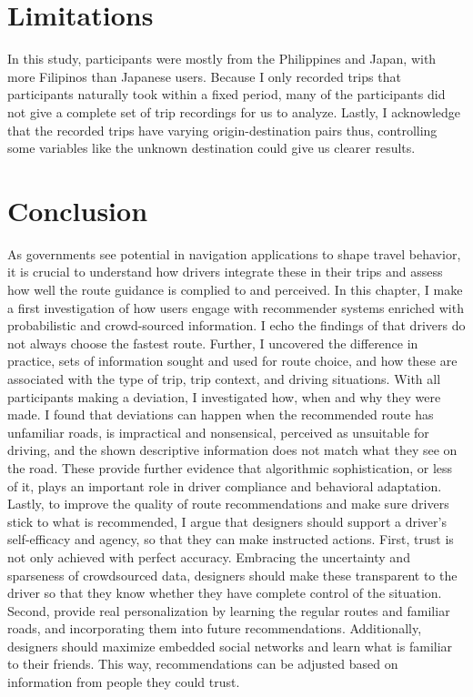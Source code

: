 \section{Limitations}
In this study, participants were mostly from the Philippines and Japan, with more Filipinos than Japanese users. Because I only recorded trips that participants naturally took within a fixed period, many of the participants did not give a complete set of trip recordings for us to analyze. Lastly, I acknowledge that the recorded trips have varying origin-destination pairs thus, controlling some variables like the unknown destination could give us clearer results. 

\section{Conclusion}
As governments see potential in navigation applications to shape travel behavior, it is crucial to understand how drivers integrate these in their trips and assess how well the route guidance is complied to and perceived. In this chapter, I make a first investigation of how users engage with recommender systems enriched with probabilistic and crowd-sourced information. I echo the findings of \cite{Quercia2014, Zhu2015DoPrinciple,Tang2016AnalyzingData,Fujino2018DetectingTracks,Brown2012TheGPS} that drivers do not always choose the fastest route. Further, I uncovered the difference in practice, sets of information sought and used for route choice, and how these are associated with the type of trip, trip context, and driving situations. With all participants making a deviation, I investigated how, when and why they were made. I found that deviations can happen when the recommended route has unfamiliar roads, is impractical and nonsensical, perceived as unsuitable for driving, and the shown descriptive information does not match what they see on the road. These provide further evidence that algorithmic sophistication, or less of it, plays an important role in driver compliance and behavioral adaptation. Lastly, to improve the quality of route recommendations and make sure drivers stick to what is recommended, I argue that designers should support a driver’s self-efficacy and agency, so that they can make instructed actions\cite{Brown2012TheGPS}. First, trust is not only achieved with perfect accuracy. Embracing the uncertainty and sparseness of crowdsourced data, designers should make these transparent to the driver so that they know whether they have complete control of the situation. Second, provide real personalization by learning the regular routes and familiar roads, and incorporating them into future recommendations. Additionally, designers should maximize embedded social networks and learn what is familiar to their friends. This way, recommendations can be adjusted based on information from people they could trust. 
